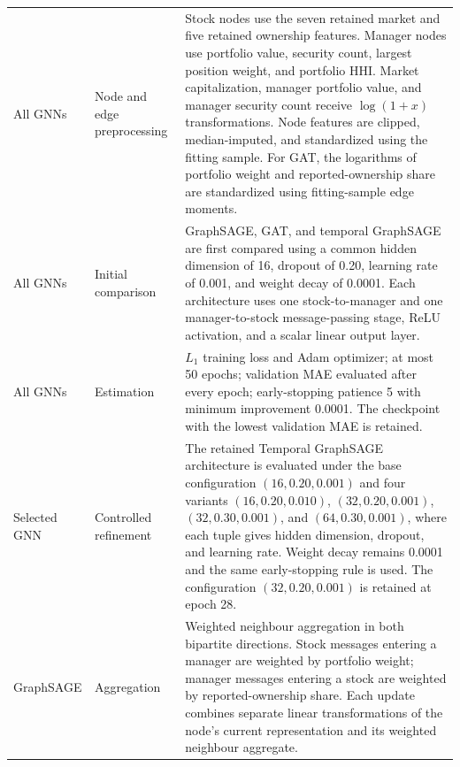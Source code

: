 \begin{longtable}{>{\raggedright\arraybackslash}p{}>{\raggedright\arraybackslash}p{}>{\raggedright\arraybackslash}p{}}
        All GNNs
              & Node and edge preprocessing
              & Stock nodes use the seven retained market and five retained ownership features. Manager nodes use portfolio value, security count, largest position weight, and portfolio HHI. Market capitalization, manager portfolio value, and manager security count receive $\log(1+x)$ transformations. Node features are clipped, median-imputed, and standardized using the fitting sample. For GAT, the logarithms of portfolio weight and reported-ownership share are standardized using fitting-sample edge moments.                 \\
        All GNNs
              & Initial comparison
              & GraphSAGE, GAT, and temporal GraphSAGE are first compared using a common hidden dimension of 16, dropout of 0.20, learning rate of 0.001, and weight decay of 0.0001. Each architecture uses one stock-to-manager and one manager-to-stock message-passing stage, ReLU activation, and a scalar linear output layer.                                                                                                                                                                                                                  \\
        All GNNs
              & Estimation
              & $L_1$ training loss and Adam optimizer; at most 50 epochs; validation MAE evaluated after every epoch; early-stopping patience 5 with minimum improvement 0.0001. The checkpoint with the lowest validation MAE is retained.                                                                                                                                                                                                                                                                                                      \\
        Selected GNN
              & Controlled refinement
              & The retained Temporal GraphSAGE architecture is evaluated under the base configuration $(16,0.20,0.001)$ and four variants $(16,0.20,0.010)$, $(32,0.20,0.001)$, $(32,0.30,0.001)$, and $(64,0.30,0.001)$, where each tuple gives hidden dimension, dropout, and learning rate. Weight decay remains 0.0001 and the same early-stopping rule is used. The configuration $(32,0.20,0.001)$ is retained at epoch 28.                                                                                                                         \\
        GraphSAGE
              & Aggregation
              & Weighted neighbour aggregation in both bipartite directions. Stock messages entering a manager are weighted by portfolio weight; manager messages entering a stock are weighted by reported-ownership share. Each update combines separate linear transformations of the node's current representation and its weighted neighbour aggregate.                                                                                                                                                                                      \\

\end{longtable}
